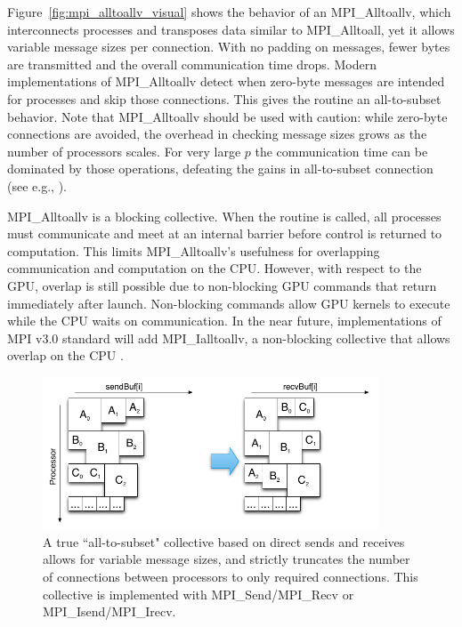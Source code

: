 \documentclass{report}
\begin{document}
Figure~\ref{fig:mpi_alltoallv_visual} shows the behavior of an MPI\_Alltoallv, which interconnects processes and transposes data similar to MPI\_Alltoall, yet it allows variable message sizes per connection. With no padding on messages, fewer bytes are transmitted and the overall communication time drops. Modern implementations of MPI\_Alltoallv detect when zero-byte messages are intended for processes and skip those connections. This gives the routine an all-to-subset behavior. Note that MPI\_Alltoallv should be used with caution: while zero-byte connections are avoided, the overhead in checking message sizes grows as the number of processors scales. For very large $p$ the communication time can be dominated by those operations, defeating the gains in all-to-subset connection (see e.g., \cite{Balaji2010}). 


MPI\_Alltoallv is a blocking collective. When the routine is called, all processes must communicate and meet at an internal barrier before control is returned to computation. This limits MPI\_Alltoallv's usefulness for overlapping communication and computation on the CPU. However, with respect to the GPU, overlap is still possible due to non-blocking GPU commands that return immediately after launch. Non-blocking commands allow GPU kernels to execute while the CPU waits on communication. In the near future, implementations of MPI v3.0 standard will add MPI\_Ialltoallv, a non-blocking collective that allows overlap on the CPU \cite{MPI}.

\begin{figure}
\centering
\includegraphics[width=10cm]{../figures/omnigraffle/MPI_IsendIrecv_Visual.png}
\caption{A true ``all-to-subset" collective based on direct sends and receives allows for variable message sizes, and strictly truncates the number of connections between processors to only required connections. This collective is implemented with MPI\_Send/MPI\_Recv or MPI\_Isend/MPI\_Irecv.}
\label{fig:mpi_isendirecv_visual}
\end{figure}
\end{document}
